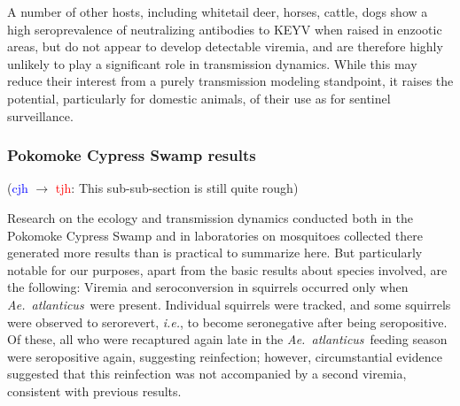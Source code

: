 \documentclass[12pt]{article}
\newcommand{\atl}{\textit{Ae.\ atlanticus}}
\newcommand{\ie}{\textit{i.e.}}
\newcommand{\cjh}{\textcolor{blue}{cjh}}
\newcommand{\tjh}{\textcolor{red}{tjh}}
\newcommand{\msg}[3]{(#1 $\rightarrow$ #2: #3)}
\newcommand{\mct}[1]{\msg\cjh\tjh{#1}}
\begin{document}
                A number of other hosts, including whitetail deer, horses, cattle, dogs show a high seroprevalence of neutralizing antibodies to KEYV when raised in enzootic areas, but do not appear to develop detectable viremia, and are therefore highly unlikely to play a significant role in transmission dynamics.\cite{parkin1973occurrence,watts1982serologic,watts1979experimental} While this may reduce their interest from a purely transmission modeling standpoint, it raises the potential, particularly for domestic animals, of their use as for sentinel surveillance.\cite{parkin1973occurrence}

            \subsubsection{Pokomoke Cypress Swamp results}
                \label{pokomoke-results}
                \mct{This sub-sub-section is still quite rough}

                Research on the ecology and transmission dynamics conducted both in the Pokomoke Cypress Swamp and in laboratories on mosquitoes collected there generated more results than is practical to summarize here. But particularly notable for our purposes, apart from the basic results about species involved, are the following: Viremia and seroconversion in squirrels occurred only when \atl\ were present.\cite{watts1988maintenance} Individual squirrels were tracked, and some squirrels were observed to serorevert, \ie, to become seronegative after being seropositive. Of these, all who were recaptured again late in the \atl\ feeding season were seropositive again, suggesting reinfection; however, circumstantial evidence suggested that this reinfection was not accompanied by a second viremia\cite{watts1988maintenance}, consistent with previous results\cite{watts1979experimental}.
                
\end{document}
